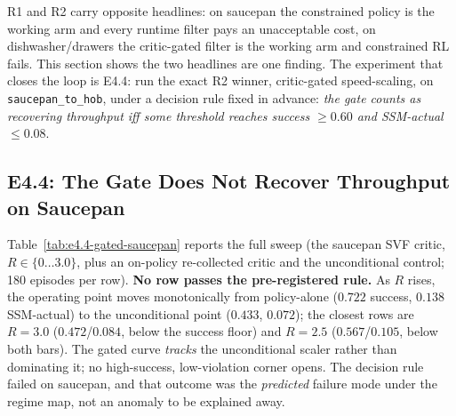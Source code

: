 \documentclass[11pt,a4paper]{report}
\newcommand{\ssm}{SSM}
\begin{document}
R1 and R2 carry opposite headlines: on saucepan the constrained
policy is the working arm and every runtime filter pays an
unacceptable cost, on dishwasher/drawers the critic-gated filter is
the working arm and constrained RL fails. This section shows the two
headlines are one finding. The experiment that closes the loop is
E4.4: run the exact R2 winner, critic-gated speed-scaling, on
\texttt{saucepan\_to\_hob}, under a decision rule fixed in advance:
\emph{the gate counts as recovering throughput iff some threshold
reaches success $\geq 0.60$ and \ssm{}-actual $\leq 0.08$}.

\subsection{E4.4: The Gate Does Not Recover Throughput on Saucepan}

Table~\ref{tab:e4.4-gated-saucepan} reports the full sweep (the
saucepan SVF critic, $R \in \{0 \ldots 3.0\}$, plus an on-policy
re-collected critic and the unconditional control; 180 episodes per
row). \textbf{No row passes the pre-registered rule.} As $R$ rises,
the operating point moves monotonically from policy-alone
($0.722$ success, $0.138$ \ssm{}-actual) to the unconditional point
($0.433$, $0.072$); the closest rows are $R = 3.0$ ($0.472$/$0.084$,
below the success floor) and $R = 2.5$ ($0.567$/$0.105$, below both
bars). The gated curve \emph{tracks} the unconditional scaler rather
than dominating it; no high-success, low-violation corner opens.
The decision rule failed on saucepan, and that outcome was the
\emph{predicted} failure mode under the regime map, not an anomaly to
be explained away.
\end{document}
